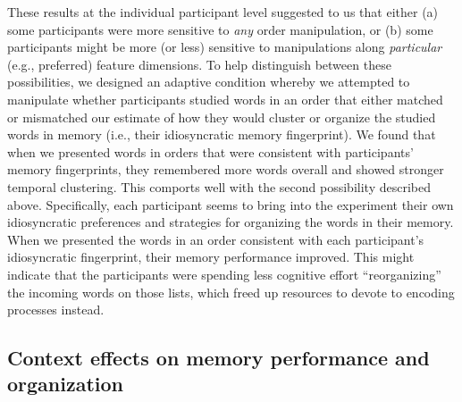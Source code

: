 \documentclass[11pt]{article}
\begin{document}
These results at the individual participant level suggested to us that either
(a) some participants were more sensitive to \textit{any} order manipulation,
or (b) some participants might be more (or less) sensitive to manipulations
along \textit{particular} (e.g., preferred) feature dimensions. To help
distinguish between these possibilities, we designed an adaptive condition
whereby we attempted to manipulate whether participants studied words in an
order that either matched or mismatched our estimate of how they would cluster
or organize the studied words in memory (i.e., their idiosyncratic memory
fingerprint). We found that when we presented words in orders that were
consistent with participants' memory fingerprints, they remembered more words
overall and showed stronger temporal clustering. This comports well with the
second possibility described above. Specifically, each participant seems to
bring into the experiment their own idiosyncratic preferences and strategies
for organizing the words in their memory. When we presented the words in an
order consistent with each participant's idiosyncratic fingerprint, their
memory performance improved. This might indicate that the participants were
spending less cognitive effort ``reorganizing'' the incoming words on those
lists, which freed up resources to devote to encoding processes instead.


\subsection*{Context effects on memory performance and organization}
\end{document}
